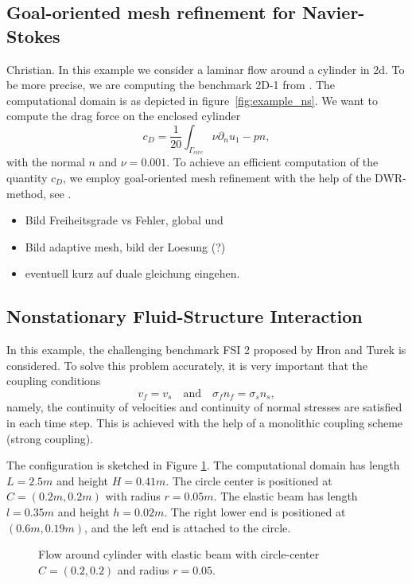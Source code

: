 \documentclass[prodmode,acmtoms]{acmsmall}
\numberwithin{equation}{section}
\begin{document}
\subsection{Goal-oriented mesh refinement for Navier-Stokes}
Christian.
In this example we consider a laminar flow around a cylinder in 2d. To be more precise, we are computing the benchmark 2D-1 from \cite{TuSchae96}. The computational domain is as depicted in figure~\ref{fig:example_ns}. We want to compute the drag force on the enclosed cylinder
\begin{equation}
c_D = \frac 1 {20} \int_{\Gamma_{circ}} \nu\partial_nu _1 - pn,
\end{equation}
with the normal $n$ and $\nu = 0.001$. To achieve an efficient computation of the quantity $c_D$, we employ goal-oriented mesh refinement with the help of the DWR-method, see \cite{BeRa96}.

\begin{itemize}
\item Bild Freiheitsgrade vs Fehler, global und 
\item Bild adaptive mesh, bild der Loesung (?)
\item eventuell kurz auf duale gleichung eingehen.
\end{itemize}

\subsection{Nonstationary Fluid-Structure Interaction}
In this example, the challenging benchmark FSI 2
proposed by Hron and Turek \cite{HrTu06b} is considered.
To solve this problem accurately, it is very important that 
the coupling conditions
\[
v_f = v_s \quad \text{and} \quad \sigma_f n_f = \sigma_s n_s, 
\]
namely, the continuity of velocities and continuity of normal stresses
are satisfied in each time step. This is achieved with the help of 
a monolithic coupling scheme (strong coupling).

The configuration is 
sketched in Figure \ref{configuration_csm_and_fsi_2D}. 
The computational domain has length $L=2.5m$ and height $H=0.41m$. The circle center
is positioned at $C=(0.2m,0.2m)$ with radius $r=0.05m$. The elastic beam has length
$l=0.35m$ and height $h=0.02m$. The right lower end is positioned at 
$(0.6m,0.19m)$, and
the left end is attached to the circle. 

\begin{figure}[h]
\centering

\caption{Flow around cylinder with elastic beam with 
circle-center $C=(0.2,0.2)$ and radius $r=0.05$.}
\label{configuration_csm_and_fsi_2D}
\end{figure}
\end{document}
